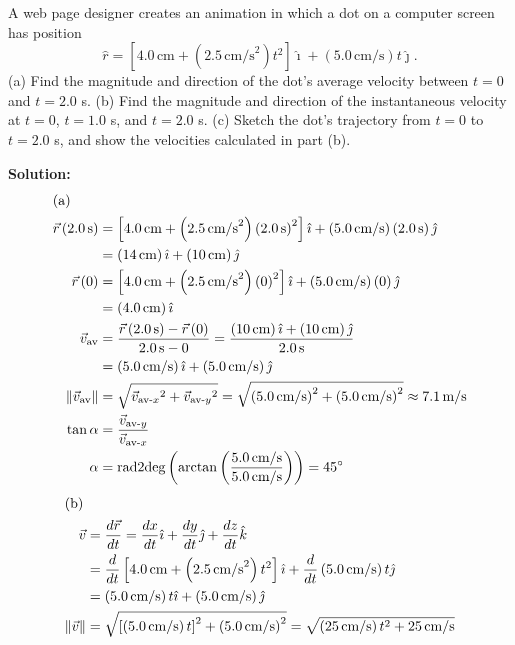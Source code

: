 \documentclass[12pt]{article}
\newenvironment{problem}[2][]{
    \begin{trivlist}
        \item[
            {\bfseries #1}
            {\bfseries #2}
        ]
}{\end{trivlist}}
\newcommand{\solution}{\medskip\noindent\textbf{Solution:}}
\newcommand{\Part}[1]{\shortintertext{(#1)}}
\newcommand{\magnitude}[1]{\lVert #1 \rVert}
\newcommand{\UVector}[2]{\left(#1\right)\ihat + \left(#2\right)\jhat}
\newcommand{\ihat}{\hat{\imath}}
\newcommand{\jhat}{\hat{\jmath}}
\newcommand{\radtodeg}[1]{\mbox{rad2deg}\left(#1\right)}
\newcommand{\unit}[1]{\, \text{#1}}
\newcommand{\cm}{\unit{cm}}
\newcommand{\cms}{\unit{cm/s}}
\newcommand{\mps}{\unit{m/s}}
\newcommand{\s}{\unit{s}}
\begin{document}
\begin{problem}{3.3}
    A web page designer creates an animation in which a dot on a computer screen has position
    $$\hat{r} = \left[4.0 \cm + \left(2.5 \cms^2\right) t^2\right] \ihat + \left(5.0 \cms\right) t \jhat.$$
    (a) Find the magnitude and direction of the dot's average velocity between $t = 0$ and $t = 2.0$ s.
    (b) Find the magnitude and direction of the instantaneous velocity at $t = 0$, $t = 1.0$ s, and $t = 2.0$ s.
    (c) Sketch the dot's trajectory from $t = 0$ to $t = 2.0$ s, and show the velocities calculated in part (b).

    \solution
    \begin{align}
        \Part{a}
        \vec{r} \left(2.0 \s\right) &= \left[4.0 \cm + \left(2.5 \cms^2\right) \left(2.0 \s\right)^2\right] \ihat + \left(5.0 \cms\right) \left(2.0 \s\right) \jhat \\
        &= \left(14 \cm\right) \ihat + \left(10 \cm\right) \jhat \\
        \vec{r} \left(0\right) &= \left[4.0 \cm + \left(2.5 \cms^2\right) \left(0\right)^2\right] \ihat + \left(5.0 \cms\right) \left(0\right) \jhat \\
        &= \left(4.0 \cm\right) \ihat \\
        \vec{v}_{\text{av}} &= \frac{\vec{r} \left(2.0 \s\right) - \vec{r} \left(0\right)}{2.0 \s - 0} = \frac{\UVector{10 \cm}{10 \cm}}{2.0 \s} \\
        &= \UVector{5.0 \cms}{5.0 \cms} \\
        \magnitude{\vec{v}_{\text{av}}} &= \sqrt{{\vec{v}_{\text{av-}x}}\phantom{}^2 + {\vec{v}_{\text{av-}y}}\phantom{}^2} = \sqrt{\left(5.0 \cms\right)^2 + \left(5.0 \cms\right)^2} \approx 7.1 \mps \\
        \tan \alpha &= \frac{\vec{v}_{\text{av-}y}}{\vec{v}_{\text{av-}x}} \\
        \alpha &= \radtodeg{\arctan{\left(\frac{5.0 \cms}{5.0 \cms}\right)}} = 45^\circ 
    \end{align}
    \begin{align}
        \Part{b}
        \vec{v} &= \frac{d\vec{r}}{dt} = \frac{dx}{dt} \ihat + \frac{dy}{dt} \jhat + \frac{dz}{dt} \hat{k} \\
        &= \frac{d}{dt} \left[4.0 \cm + \left(2.5 \cms^2\right) t^2\right] \ihat + \frac{d}{dt} \left(5.0 \cms\right) t \jhat \\
        &= \left(5.0 \cms\right) t \ihat + \left(5.0 \cms\right) \jhat \\
        \magnitude{\vec{v}} &= \sqrt{\left[\left(5.0 \cms\right) t\right]^2 + \left(5.0 \cms\right)^2} = \sqrt{\left(25 \cms\right) t^2 + 25 \cms} \\

\end{align}
\end{problem}
\end{document}
